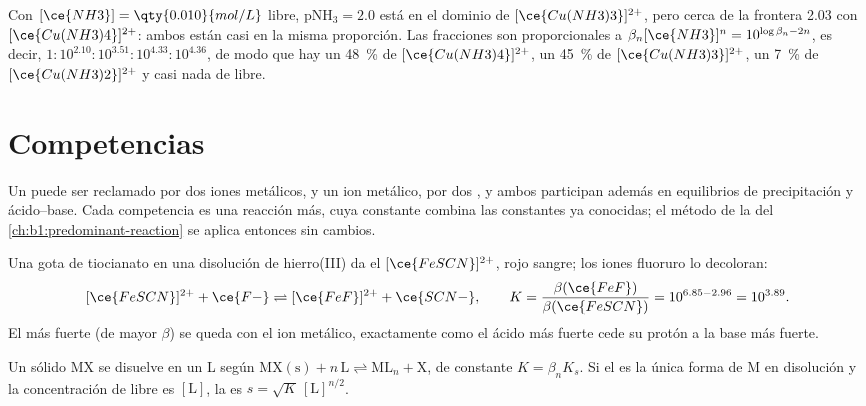 \begin{example}\label{ex:b1:complexation:cu}
Con $[\ce{NH3}] = \qty{0.010}{mol/L}$ libre, $\mathrm{pNH_3} = 2.0$ está
en el dominio de $[\ce{Cu(NH3)3}]^{2+}$, pero cerca de la frontera 2.03
con $[\ce{Cu(NH3)4}]^{2+}$: ambos están casi en la misma proporción. Las
fracciones son proporcionales a $\beta_n[\ce{NH3}]^n = 10^{\log\beta_n - 2n}$,
es decir,
$1 : 10^{2.10} : 10^{3.51} : 10^{4.33} : 10^{4.36}$, de modo que hay un
\qty{48}{\percent} de $[\ce{Cu(NH3)4}]^{2+}$, un \qty{45}{\percent} de
$[\ce{Cu(NH3)3}]^{2+}$, un \qty{7}{\percent} de $[\ce{Cu(NH3)2}]^{2+}$ y
casi nada de  libre.
\end{example}

\section{Competencias}

Un  puede ser reclamado por dos iones metálicos, y un ion
metálico, por dos , y ambos participan además en equilibrios de
precipitación y ácido--base. Cada competencia es una reacción más, cuya
constante combina las constantes ya conocidas; el método de la  del \cref{ch:b1:predominant-reaction} se aplica entonces
sin cambios.

\begin{example}\label{ex:b1:complexation:scn-f}
Una gota de tiocianato en una disolución de hierro(III) da el
$[\ce{FeSCN}]^{2+}$, rojo sangre; los iones fluoruro lo decoloran:
\[
  [\ce{FeSCN}]^{2+} + \ce{F-} \rightleftharpoons [\ce{FeF}]^{2+} + \ce{SCN-},
  \qquad K = \frac{\beta(\ce{FeF})}{\beta(\ce{FeSCN})} = 10^{6.85 - 2.96} =
  10^{3.89} .
\]
El  más fuerte (de mayor $\beta$) se queda con el ion metálico,
exactamente como el ácido más fuerte cede su protón a la base más fuerte.
\end{example}

\begin{proposition}\label{prop:b1:complexation:competition-precipitation}
Un sólido MX se disuelve en un  L según
$\mathrm{MX(s)} + n\,\mathrm{L} \rightleftharpoons \mathrm{ML}_n + \mathrm{X}$,
de constante $K = \beta_n K_s$. Si el  es la única forma de M en
disolución y la concentración de  libre es $[\mathrm{L}]$, la
 es $s = \sqrt{K}\,[\mathrm{L}]^{n/2}$.
\end{proposition}

